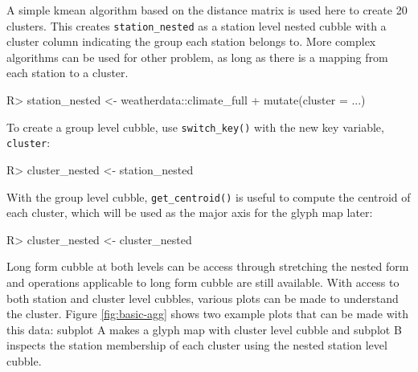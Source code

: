 \documentclass[
]{jss}
\begin{document}
A simple kmean algorithm based on the distance matrix is used here to
create 20 clusters. This creates \texttt{station\_nested} as a station
level nested cubble with a cluster column indicating the group each
station belongs to. More complex algorithms can be used for other
problem, as long as there is a mapping from each station to a cluster.

\begin{CodeChunk}
\begin{CodeInput}
R> station_nested <- weatherdata::climate_full %
+   mutate(cluster = ...)
\end{CodeInput}
\end{CodeChunk}

To create a group level cubble, use \texttt{switch\_key()} with the new
key variable, \texttt{cluster}:

\begin{CodeChunk}
\begin{CodeInput}
R> cluster_nested <- station_nested %
\end{CodeInput}
\end{CodeChunk}

With the group level cubble, \texttt{get\_centroid()} is useful to
compute the centroid of each cluster, which will be used as the major
axis for the glyph map later:

\begin{CodeChunk}
\begin{CodeInput}
R> cluster_nested <- cluster_nested %
\end{CodeInput}
\end{CodeChunk}

Long form cubble at both levels can be access through stretching the
nested form and operations applicable to long form cubble are still
available. With access to both station and cluster level cubbles,
various plots can be made to understand the cluster. Figure
\ref{fig:basic-agg} shows two example plots that can be made with this
data: subplot A makes a glyph map with cluster level cubble and subplot
B inspects the station membership of each cluster using the nested
station level cubble.
\end{document}
